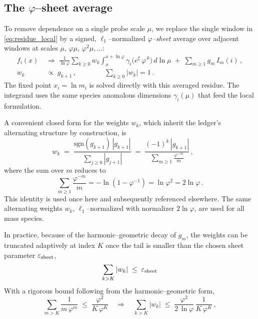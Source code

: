 \documentclass[%
  amsmath,amssymb,
  aps,
 prb,
 floatfix, showkeys
 ]{revtex4-2}
\begin{document}
 \subsection{  The $\varphi$--sheet average} 
 \label{subsec:phi-sheet}
 To remove dependence on a single probe scale $\mu$, we replace the single window
 in \eqref{eq:residue_local} by a signed, $\ell_1$–normalized \emph{$\varphi$–sheet} average
 over adjacent windows at scales $\mu,\,\varphi\mu,\,\varphi^2\mu,\dots$:
 \begin{align}
   f_i(x)
   &\;\Rightarrow\; \frac{1}{\ln\varphi} \sum_{k\ge 0} w_k \int_{x}^{x+\ln\varphi}\!
      \gamma_i\!\big(e^{\xi}\,\varphi^{\,k}\big)\,d\ln\mu \;+\; \sum_{m\ge 1} g_m\,I_m(i)\,,
   \label{eq:sheet_residue}\\[2pt]
   w_k &\;\propto\; g_{k+1}\,,\qquad     %
   \qquad \sum_{k\ge 0} |w_k|=1\,.
 \end{align}
 The fixed point $x_i=\ln m_i$ is solved directly with this averaged residue.
 The integrand uses the same species anomalous dimensions $\gamma_i(\mu)$ that feed the
 local formulation.
 
 A convenient closed form for the weights $w_k$, which inherit the ledger’s alternating structure by construction, is
 \begin{equation}
   w_k \;=\; \frac{\mathrm{sgn}(g_{k+1})\,|g_{k+1}|}{\sum_{j\ge 0} |g_{j+1}|}
   \;=\; \frac{(-1)^k\,|g_{k+1}|}{\displaystyle \sum_{m\ge 1} \frac{\varphi^{-m}}{m}}\,,\qquad
   \label{eq:wk_closed_form}
 \end{equation}
 where the sum over $m$ reduces to 
 \begin{equation}
   \sum_{m\ge 1} \frac{\varphi^{-m}}{m} = -\ln(1-\varphi^{-1}) = \ln \varphi^2   = 2\ln\varphi\,.
   \label{eq:wk_closed_form_1}
 \end{equation}
 This identity is used once here and subsequently referenced elsewhere.
 The same alternating weights $w_k$,   $\ell_1$–normalized with normalizer $2\ln\varphi$,
 are used for all mass species.
 
 In practice, because of the harmonic–geometric decay of $g_m$, 
 the weights can be truncated adaptively at index $K$ once the tail is smaller than
 the chosen sheet parameter  $\varepsilon_{\rm sheet}$,
 \begin{equation}
   \sum_{k>K} |w_k| \;\le\; \varepsilon_{\rm sheet}
   \label{eq:sheet_tail_criterion}
 \end{equation}
 With a rigorous bound following from the harmonic–geometric form, 
 \begin{equation}
  \sum_{m>K}\frac{1}{m\,\varphi^m}
 \;\le\; \frac{\varphi^2}{K\,\varphi^{K}}
 \quad\Rightarrow\quad
  \sum_{k>K} |w_k| \;\le\; \frac{\varphi^{2}}{2\,\ln\varphi}\,\frac{1}{K\,\varphi^{K}}\,,
   \label{eq:sheet_tail_bound}
 \end{equation}
 
\end{document}
